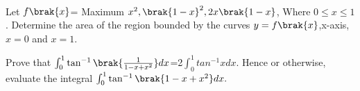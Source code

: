 \hfill{}\\

\item  Let $f\brak{x}$= Maximum {$x^2,\brak{1-x}^2,2x\brak{1-x}$}, Where $0 \leq x \leq 1$. Determine the area of the region bounded by the curves $y=f\brak{x}$,x-axis,$x=0$ and $x=1$.
\hfill{}\\
\item  Prove that $\int_{0}^{1}\tan ^{-1}\brak{\frac{1}{1-x+x^2}}dx$=2$\int_{0}^{1} tan^{-1}xdx$. Hence or otherwise, evaluate the integral $\int_{0}^{1}\tan ^{-1}\brak{1-x+x^2}dx.$\\
\hfill{}



%
